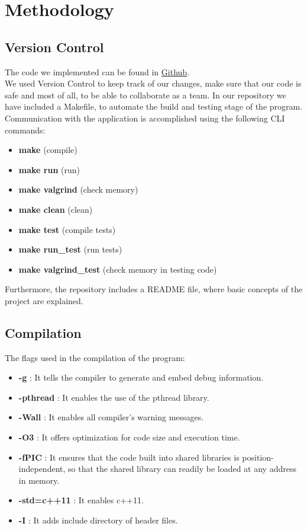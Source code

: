 \documentclass{article}
\begin{document}
\section{Methodology}
\subsection{Version Control}
The code we implemented can be found in
\href{https://github.com/NefeliTav/Software-Development-for-Information-Systems}{Github}. \\
We used Version Control to keep track of our changes, make sure that our code is safe and most of all, to be able to collaborate as a team.
In our repository we have included a Makefile, to automate the build and testing stage of the program.  \\ 
Communication with the application is accomplished using the following CLI commands:
\begin{itemize}
  \item \textbf{make} (compile)
  \item \textbf{make run} (run)
  \item \textbf{make valgrind} (check memory)
  \item \textbf{make clean} (clean)
  \item \textbf{make test} (compile tests)
  \item \textbf{make run\_test} (run tests)
  \item \textbf{make valgrind\_test} (check memory in testing code)
\end{itemize}
Furthermore, the repository includes a README file, where basic concepts of the project are explained.
\subsection{Compilation}
The flags used in the compilation of the program:
\begin{itemize}
  \item \textbf{-g} : It tells the compiler to generate and embed debug information.
  \item \textbf{-pthread} : It enables the use of the pthread library.
  \item \textbf{-Wall} : It enables all compiler's warning messages.
  \item \textbf{-O3} : It offers optimization for code size and execution time.
  \item \textbf{-fPIC} : It ensures that the code built into shared libraries is position-independent, so that the shared library can readily be loaded at any address in memory.
  \item \textbf{-std=c++11} : It enables c++11.
  \item \textbf{-I} : It adds include directory of header files.
\end{itemize}
\end{document}
